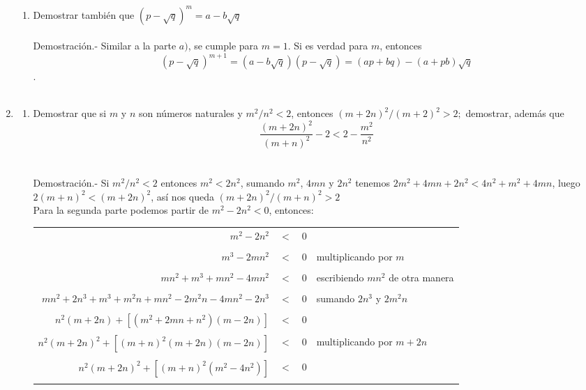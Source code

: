 \begin{enumerate}
\begin{enumerate}[\bfseries (a)]
\item Demostrar también que $(p - \sqrt{q})^m = a - b\sqrt{q}$\\\\
Demostración.- \; Similar a la parte $a)$, se cumple para $m=1$. Si es verdad para $m$, entonces $$(p-\sqrt{q})^{m+1} = (a - b\sqrt{q})(p - \sqrt{q}) = (ap+bq)-(a+pb)\sqrt{q}$$.\\\\
\end{enumerate}

\item 
\begin{enumerate}[\bfseries (a)]
\item Demostrar que si $m$ \; y \; $n$ son números naturales y $m^2/n^2 < 2$, entonces $\left( m+2n \right)^2 / \left( m + 2 \right)^2 > 2;$ demostrar, además que $$\dfrac{\left( m + 2n \right)^2}{\left( m + n \right)^2} - 2 < 2 - \dfrac{m^2}{n^2}$$\\\\
Demostración.- \; Si $m^2/n^2 < 2$ entonces $m^2 < 2 n^2$, sumando $m^2$, $4mn$ y $2n^2$ tenemos $2m^2 + 4mn + 2n^2 < 4n^2 + m^2 + 4mn$, luego $2(m+n)^2 < (m+2n)^2$, así nos queda $(m + 2n)^2 / (m+n)^2 > 2$\\
Para la segunda parte podemos partir de $m^2 - 2n^2<0$, entonces:
\begin{center}
\begin{tabular}{r c l l}
$m^2 - 2n^2$&$<$&$0$&\\\\
$m^3 - 2mn^2$&$<$&$0$&multiplicando por $m$\\\\
$mn^2 + m^3 + mn^2 - 4mn^2$&$<$&$0$&escribiendo $mn^2$ de otra manera\\\\
$mn^2 + 2n^3 + m^3 + m^2 n + mn^2 -2m^2 n - 4mn^2 -2n^3$&$<$&$0$&sumando $2n^3$ y $2m^2 n$\\\\
$n^2 (m+2n) + \left[ (m^2 + 2mn + n^2)(m-2n) \right]$&$<$&$0$&\\\\
$ n^2(m+2n)^2  +  \left[ (m+n)^2 (m+2n)(m-2n) \right]$&$<$&$0$&multiplicando por $m+2n$\\\\
$n^2(m+2n)^2  +  \left[ (m+n)^2 (m^2 - 4n^2) \right]$&$<$&$0$&\\\\

\end{tabular}
\end{center}
\end{enumerate}
\end{enumerate}
